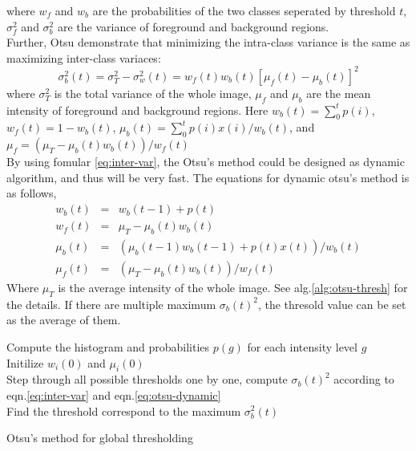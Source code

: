 where $w_f$ and $w_b$ are the probabilities of the two classes seperated by threshold $t$, $\sigma_f^2$ and $\sigma_b^2$ are the variance of foreground and background regions.\\
Further, Otsu demonstrate that minimizing the intra-class variance is the same as maximizing inter-class variaces:
\begin{equation} \label{eq:inter-var}
\sigma_b^2(t) = \sigma_T^2 - \sigma_w^2(t) = w_f(t)w_b(t)[\mu_f(t) - \mu_b(t)]^2
\end{equation}
where $\sigma_T^2$ is the total variance of the whole image, $\mu_f$ and $\mu_b$ are the mean intensity of foreground and background regions. Here $w_b(t) = \sum_0^tp(i)$, $w_f(t) = 1 - w_b(t)$, $\mu_b(t) = \sum_0^tp(i)x(i)/w_b(t)$, and $\mu_f = (\mu_T - \mu_b(t)w_b(t))/w_f(t)$\\
By using fomular \ref{eq:inter-var}, the Otsu's method could be designed as dynamic algorithm, and thus will be very fast. The equations for dynamic otsu's method is as follows, 
\begin{equation} \label{eq:otsu-dynamic}
\begin{array}{lll}
	w_b(t) & = & w_b(t-1) + p(t) \\
	w_f(t) & = & \mu_T - \mu_b(t)w_b(t) \\
	\mu_b(t) & = & (\mu_b(t-1)w_b(t-1) + p(t)x(t))/w_b(t)\\
	\mu_f(t) & = & (\mu_T - \mu_b(t)w_b(t))/w_f(t)
\end{array}
\end{equation}
Where $\mu_T$ is the average intensity of the whole image. See alg.\ref{alg:otsu-thresh} for the details. If there are multiple maximum $\sigma_b(t)^2$, the thresold value can be set as the average of them.
\begin{algorithm}
\SetAlgoLined
{}
Compute the histogram and probabilities $p(g)$ for each intensity level $g$\\
Initilize $w_i(0)$ and $\mu_i(0)$\\
Step through all possible thresholds one by one, compute $\sigma_b(t)^2$ according to eqn.\ref{eq:inter-var} and eqn.\ref{eq:otsu-dynamic}\\
Find the threshold correspond to the maximum $\sigma_b^2(t)$
\caption{Otsu's method for global thresholding}
\label{alg:otsu-thresh}
\end{algorithm}

